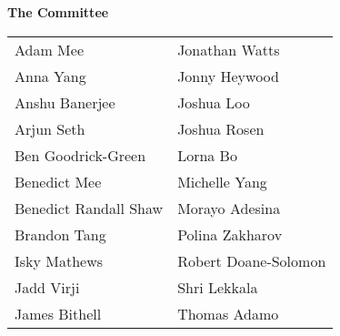 \vspace{0.25em}

\textbf{The Committee}

\begin{tabular}{ p{4cm} p{4cm} }
	Adam Mee & Jonathan Watts \\
	Anna Yang & Jonny Heywood \\
	Anshu Banerjee & Joshua Loo \\
	Arjun Seth & Joshua Rosen \\
	Ben Goodrick-Green & Lorna Bo \\
	Benedict Mee & Michelle Yang \\
	Benedict Randall Shaw & Morayo Adesina \\
	Brandon Tang & Polina Zakharov \\
	Isky Mathews & Robert Doane-Solomon \\
	Jadd Virji & Shri Lekkala \\
	James Bithell & Thomas Adamo \\
\end{tabular}